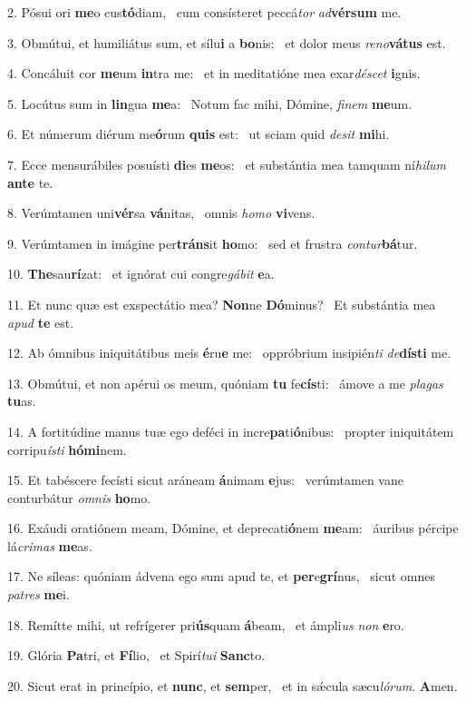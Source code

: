 2. Pósui ori \textbf{me}o cus\textbf{tó}diam, \ast\  cum consísteret peccá\textit{tor} \textit{ad}\textbf{vér}\textbf{sum} me.\

3. Obmútui, et humiliátus sum, et sílu\textbf{i} a \textbf{bo}nis: \ast\  et dolor meus \textit{re}\textit{no}\textbf{vá}\textbf{tus} est.\

4. Concáluit cor \textbf{me}um \textbf{in}tra me: \ast\  et in meditatióne mea exar\textit{dé}\textit{scet} \textbf{i}gnis.\

5. Locútus sum in \textbf{lin}gua \textbf{me}a: \ast\  Notum fac mihi, Dómine, \textit{fi}\textit{nem} \textbf{me}um.\

6. Et númerum diérum me\textbf{ó}rum \textbf{quis} est: \ast\  ut sciam quid \textit{de}\textit{sit} \textbf{mi}hi.\

7. Ecce mensurábiles posuísti \textbf{di}es \textbf{me}os: \ast\  et substántia mea tamquam ní\textit{hi}\textit{lum} \textbf{an}\textbf{te} te.\

8. Verúmtamen uni\textbf{vér}sa \textbf{vá}nitas, \ast\  omnis \textit{ho}\textit{mo} \textbf{vi}vens.\

9. Verúmtamen in imágine per\textbf{tráns}it \textbf{ho}mo: \ast\  sed et frustra \textit{con}\textit{tur}\textbf{bá}tur.\

10. \textbf{The}sau\textbf{rí}zat: \ast\  et ignórat cui congre\textit{gá}\textit{bit} \textbf{e}a.\

11. Et nunc quæ est exspectátio mea? \textbf{Non}ne \textbf{Dó}minus? \ast\  Et substántia mea \textit{a}\textit{pud} \textbf{te} est.\

12. Ab ómnibus iniquitátibus meis \textbf{é}ru\textbf{e} me: \ast\  oppróbrium insipién\textit{ti} \textit{de}\textbf{dís}\textbf{ti} me.\

13. Obmútui, et non apérui os meum, quóniam \textbf{tu} fe\textbf{cís}ti: \ast\  ámove a me \textit{pla}\textit{gas} \textbf{tu}as.\

14. A fortitúdine manus tuæ ego deféci in incre\textbf{pa}ti\textbf{ó}nibus: \ast\  propter iniquitátem corripu\textit{ís}\textit{ti} \textbf{hó}\textbf{mi}nem.\

15. Et tabéscere fecísti sicut aráneam \textbf{á}nimam \textbf{e}jus: \ast\  verúmtamen vane conturbátur \textit{om}\textit{nis} \textbf{ho}mo.\

16. Exáudi oratiónem meam, Dómine, et deprecati\textbf{ó}nem \textbf{me}am: \ast\  áuribus pércipe lá\textit{cri}\textit{mas} \textbf{me}as.\

17. Ne síleas: quóniam ádvena ego sum apud te, et \textbf{per}e\textbf{grí}nus, \ast\  sicut omnes \textit{pa}\textit{tres} \textbf{me}i.\

18. Remítte mihi, ut refrígerer pri\textbf{ús}quam \textbf{á}beam, \ast\  et ámpli\textit{us} \textit{non} \textbf{e}ro.\

19. Glória \textbf{Pa}tri, et \textbf{Fí}lio, \ast\  et Spirí\textit{tu}\textit{i} \textbf{Sanc}to.\

20. Sicut erat in princípio, et \textbf{nunc}, et \textbf{sem}per, \ast\  et in sǽcula sæcu\textit{ló}\textit{rum}. \textbf{A}men.\

